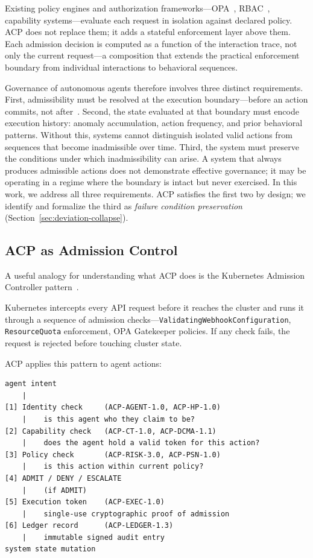 \documentclass[11pt]{article}
\theoremstyle{definition}
\begin{document}
Existing policy engines and authorization frameworks---OPA~\cite{opa}, RBAC~\cite{sandhu1996rbac},
capability systems---evaluate each request in isolation against declared policy.
ACP does not replace them; it adds a stateful enforcement layer above them.
Each admission decision is computed as a function of the interaction trace, not only the current
request---a composition that extends the practical enforcement boundary from individual interactions
to behavioral sequences.

Governance of autonomous agents therefore involves three distinct requirements.
First, admissibility must be resolved at the execution boundary---before an action commits,
not after~\cite{anderson1972planning}.
Second, the state evaluated at that boundary must encode execution history:
anomaly accumulation, action frequency, and prior behavioral patterns.
Without this, systems cannot distinguish isolated valid actions from sequences that become
inadmissible over time.
Third, the system must preserve the conditions under which inadmissibility can arise.
A system that always produces admissible actions does not demonstrate effective governance;
it may be operating in a regime where the boundary is intact but never exercised.
In this work, we address all three requirements.
ACP satisfies the first two by design; we identify and formalize the third as
\emph{failure condition preservation} (Section~\ref{sec:deviation-collapse}).

\subsection{ACP as Admission Control}

A useful analogy for understanding what ACP does is the Kubernetes Admission Controller pattern~\cite{kubernetes-admission}.

Kubernetes intercepts every API request before it reaches the cluster and runs it through a sequence of admission checks---\texttt{ValidatingWebhookConfiguration},
\texttt{ResourceQuota} enforcement, OPA Gatekeeper policies.
If any check fails, the request is rejected before touching cluster state.

ACP applies this pattern to agent actions:

\begin{lstlisting}
agent intent
    |
[1] Identity check     (ACP-AGENT-1.0, ACP-HP-1.0)
    |    is this agent who they claim to be?
[2] Capability check   (ACP-CT-1.0, ACP-DCMA-1.1)
    |    does the agent hold a valid token for this action?
[3] Policy check       (ACP-RISK-3.0, ACP-PSN-1.0)
    |    is this action within current policy?
[4] ADMIT / DENY / ESCALATE
    |    (if ADMIT)
[5] Execution token    (ACP-EXEC-1.0)
    |    single-use cryptographic proof of admission
[6] Ledger record      (ACP-LEDGER-1.3)
    |    immutable signed audit entry
system state mutation
\end{lstlisting}
\end{document}
